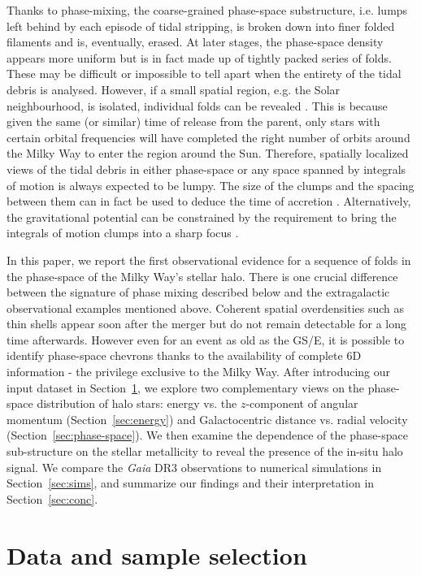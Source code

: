 \documentclass[a4paper,useAMS,usenatbib]{mnras}
\begin{document}
Thanks to phase-mixing, the coarse-grained phase-space substructure, i.e. lumps left behind by each episode of tidal stripping, is broken down into finer folded filaments and is, eventually, erased. At later stages, the phase-space density appears more uniform but is in fact made up of tightly packed series of folds. These may be difficult or impossible to tell apart when the entirety of the tidal debris is analysed. However, if a small spatial region, e.g. the Solar neighbourhood, is isolated, individual folds can be revealed \citep[see][]{McMillan2008,Gomez2010}. This is because given the same (or similar) time of release from the parent, only stars with certain orbital frequencies will have completed the right number of orbits around the Milky Way to enter the region around the Sun. Therefore, spatially localized views of the tidal debris in either phase-space or any space spanned by integrals of motion is always expected to be lumpy. The size of the clumps and the spacing between them can in fact be used to deduce the time of accretion \citep[see][]{McMillan2008,Gomez2010,jb2017}. Alternatively, the gravitational potential can be constrained by the requirement to bring the integrals of motion clumps into a sharp focus \citep[][]{DongPaez2022}.

In this paper, we report the first observational evidence for a sequence of folds in the phase-space of the Milky Way's stellar halo. There is one crucial difference between the signature of phase mixing described below and the extragalactic observational examples mentioned above. Coherent spatial overdensities such as thin shells appear soon after the merger but do not remain detectable for a long time afterwards. However even for an event as old as the GS/E, it is possible to identify phase-space chevrons thanks to the availability of complete 6D information - the privilege exclusive to the Milky Way. After introducing our input dataset in Section~\ref{sec:data}, we explore two complementary views on the phase-space distribution of halo stars: energy vs. the $z$-component of angular momentum (Section~\ref{sec:energy}) and Galactocentric distance vs. radial velocity (Section~\ref{sec:phase-space}). We then examine the dependence of the phase-space sub-structure on the stellar metallicity to reveal the presence of the in-situ halo signal. We compare the {\it Gaia} DR3 observations to numerical simulations in Section~\ref{sec:sims}, and summarize our findings and their interpretation in Section~\ref{sec:conc}. 

\section{Data and sample selection}
\label{sec:data}
\end{document}
